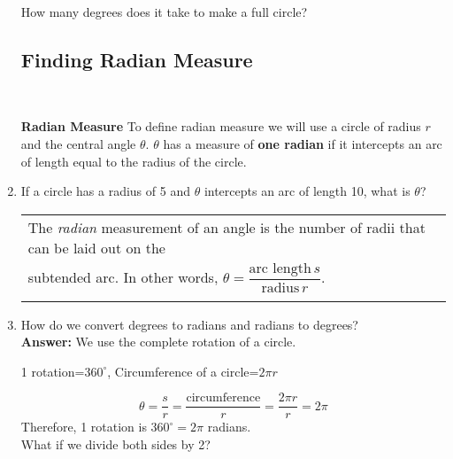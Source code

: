 \begin{enumerate}
How many degrees does it take to make a full circle?



\subsection{Finding Radian Measure} ~

\textbf{Radian Measure} To define radian measure we will use a circle
of radius $r$ and the central angle $\theta$.  $\theta$ has a measure
of \textbf{one radian} if it intercepts an arc of length equal to the
radius of the circle.



\item If a circle has a radius of 5 and $\theta$ intercepts an arc of
  length 10, what is $\theta$?
  \vfill

\hspace{-.35in}
\begin{tabular}{ | l | } \hline
  The \emph{radian} measurement of an angle is the number of radii that can be laid out on the \\
  subtended arc. In other words, $\theta = \dfrac{\text{arc length}\, s}{\text{radius}\, r}$. \\
  \\ \hline
\end{tabular}
\newpage

\item How do we convert degrees to radians and radians to degrees?\\
\textbf{Answer:}  We use the complete rotation of a circle.
\begin{center}
1 rotation=$360^\circ$, Circumference of a circle=$2\pi r$
\end{center}
$$\theta=\frac{s}{r}=\frac{\text{circumference}}{r}=\frac{2\pi r}{r}=2\pi$$
Therefore, 1 rotation is $360^\circ=2\pi$ radians.\\
What if we divide both sides by 2?\\[.2in]


\end{enumerate}
